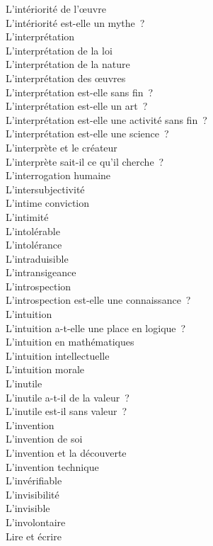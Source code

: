 \documentclass[a4paper,12pt]{article}
\begin{document}
L'intériorité de l'œuvre \\
L'intériorité est-elle un mythe ? \\
L'interprétation \\
L'interprétation de la loi \\
L'interprétation de la nature \\
L'interprétation des œuvres \\
L'interprétation est-elle sans fin ? \\
L'interprétation est-elle un art ? \\
L'interprétation est-elle une activité sans fin ? \\
L'interprétation est-elle une science ? \\
L'interprète et le créateur \\
L'interprète sait-il ce qu'il cherche ? \\
L'interrogation humaine \\
L'intersubjectivité \\
L'intime conviction \\
L'intimité \\
L'intolérable \\
L'intolérance \\
L'intraduisible \\
L'intransigeance \\
L'introspection \\
L'introspection est-elle une connaissance ? \\
L'intuition \\
L'intuition a-t-elle une place en logique ? \\
L'intuition en mathématiques \\
L'intuition intellectuelle \\
L'intuition morale \\
L'inutile \\
L'inutile a-t-il de la valeur ? \\
L'inutile est-il sans valeur ? \\
L'invention \\
L'invention de soi \\
L'invention et la découverte \\
L'invention technique \\
L'invérifiable \\
L'invisibilité \\
L'invisible \\
L'involontaire \\
Lire et écrire \\
\end{document}
